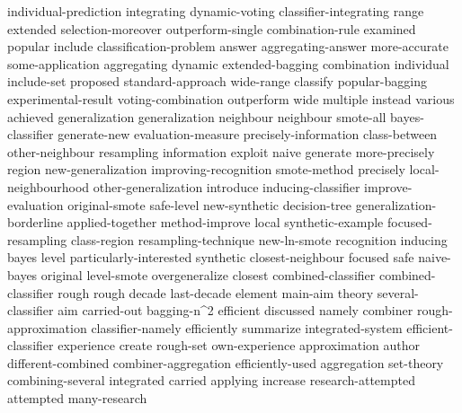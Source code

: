 individual-prediction	
integrating	
dynamic-voting	
classifier-integrating	
range	
extended	
selection-moreover	
outperform-single	
combination-rule	
examined	
popular	
include	
classification-problem	
answer	
aggregating-answer	
more-accurate	
some-application	
aggregating	
dynamic	
extended-bagging	
combination	
individual	
include-set	
proposed	
standard-approach	
wide-range	
classify	
popular-bagging	
experimental-result	
voting-combination	
outperform	
wide	
multiple	
instead	
various	
achieved	
generalization	generalization	
neighbour	neighbour	
smote-all	
bayes-classifier	
generate-new	
evaluation-measure	
precisely-information	
class-between	
other-neighbour	
resampling	
information	
exploit	
naive	
generate	
more-precisely	
region	
new-generalization	
improving-recognition	
smote-method	
precisely	
local-neighbourhood	
other-generalization	
introduce	
inducing-classifier	
improve-evaluation	
original-smote	
safe-level	
new-synthetic	
decision-tree	
generalization-borderline	
applied-together	
method-improve	
local	
synthetic-example	
focused-resampling	
class-region	
resampling-technique	
new-ln-smote	
recognition	
inducing	
bayes	
level	
particularly-interested	
synthetic	
closest-neighbour	
focused	
safe	
naive-bayes	
original	
level-smote	
overgeneralize	
closest	
combined-classifier	combined-classifier	
rough	rough	
decade	
last-decade	
element	
main-aim	
theory	
several-classifier	
aim	
carried-out	
bagging-n^2	
efficient	
discussed	
namely	
combiner	
rough-approximation	
classifier-namely	
efficiently	
summarize	
integrated-system	
efficient-classifier	
experience	
create	
rough-set	
own-experience	
approximation	
author	
different-combined	
combiner-aggregation	
efficiently-used	
aggregation	
set-theory	
combining-several	
integrated	
carried	
applying	
increase	
research-attempted	
attempted	
many-research	
